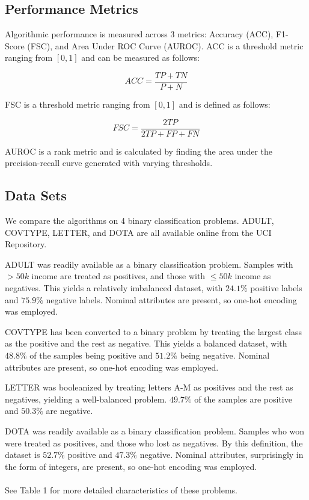 \documentclass[twoside,11pt]{article}
\begin{document}
\subsection{Performance Metrics}
Algorithmic performance is measured across 3 metrics: Accuracy (ACC), F1-Score (FSC), and Area Under ROC Curve (AUROC). ACC is a threshold metric ranging from $[0, 1]$ and can be measured as follows:

\begin{equation}
    ACC = \frac{TP + TN}{P + N}
\end{equation}

FSC is a threshold metric ranging from $[0, 1]$ and is defined as follows:

\begin{equation}
    FSC = \frac{2TP}{2TP + FP + FN}
\end{equation}

AUROC is a rank metric and is calculated by finding the area under the precision-recall curve generated with varying thresholds.

\subsection{Data Sets}
We compare the algorithms on 4 binary classification problems. ADULT, COVTYPE, LETTER, and DOTA are all available online from the UCI Repository. 

ADULT was readily available as a binary classification problem. Samples with $>50k$ income are treated as positives, and those with $\leq50k$ income as negatives. This yields a relatively imbalanced dataset, with $24.1\%$ positive labels and $75.9\%$ negative labels. Nominal attributes are present, so one-hot encoding was employed.

COVTYPE has been converted to a binary problem by treating the largest class as the positive and the rest as negative. This yields a balanced dataset, with $48.8\%$ of the samples being positive and $51.2\%$ being negative. Nominal attributes are present, so one-hot encoding was employed.

LETTER was booleanized by treating letters A-M as positives and the rest as negatives, yielding a well-balanced problem. $49.7\%$ of the samples are positive and $50.3\%$ are negative.

DOTA was readily available as a binary classification problem. Samples who won were treated as positives, and those who lost as negatives. By this definition, the dataset is $52.7\%$ positive and $47.3\%$ negative. Nominal attributes, surprisingly in the form of integers, are present, so one-hot encoding was employed.\\
\\
See Table 1 for more detailed characteristics of these problems.
\end{document}

